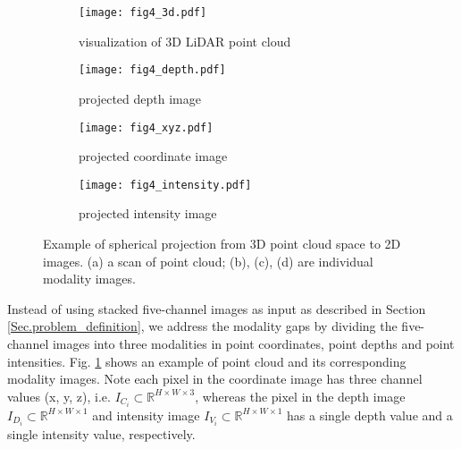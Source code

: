 \documentclass[preprint,review,3p]{elsarticle}
\begin{document}
\begin{figure}[ht]
  \centering
  \begin{subfigure}[b]{0.5\textwidth}
    \texttt{[image: fig4\_3d.pdf]}
    \caption{visualization of 3D LiDAR point cloud}
  \end{subfigure}
  \hfill
  \begin{subfigure}[b]{\textwidth}
    \texttt{[image: fig4\_depth.pdf]}
    \caption{projected depth image}
  \end{subfigure}
  \hfill
  \begin{subfigure}[b]{\textwidth}
    \texttt{[image: fig4\_xyz.pdf]}
    \caption{projected coordinate image}
  \end{subfigure}
  \hfill
  \begin{subfigure}[b]{\textwidth}
    \texttt{[image: fig4\_intensity.pdf]}
    \caption{projected intensity image}
  \end{subfigure}
  \caption{Example of spherical projection from 3D point cloud space to 2D images. (a) a scan of point cloud; (b), (c), (d) are individual modality images.}\label{figure.projection}
\end{figure}


Instead of using stacked five-channel images as input as described in Section \ref{Sec.problem_definition}, we address the modality gaps by dividing the five-channel images into three modalities in point coordinates, point depths and point intensities. Fig. \ref{figure.projection} shows an example of point cloud and its corresponding modality images. Note each pixel in the coordinate image has three channel values (x, y, z), i.e. $I_{C_i}\subset \mathbb{R}^{H \times W \times 3}$, whereas the pixel in the depth image $I_{D_i}\subset \mathbb{R}^{H \times W \times 1}$ and intensity image $I_{V_i}\subset \mathbb{R}^{H \times W \times 1}$ has a single depth value and a single intensity value, respectively.
\end{document}
